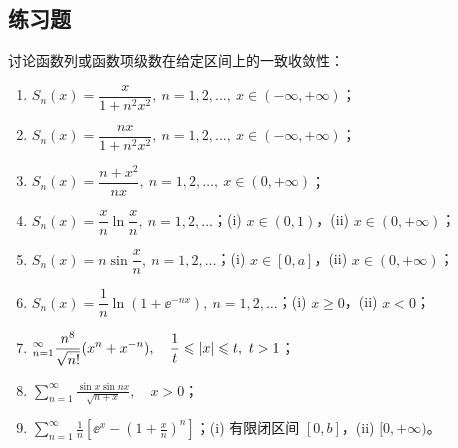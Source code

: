 \subsection{练习题}

\begin{xexercise}[1]
讨论函数列或函数项级数在给定区间上的一致收敛性：
  \begin{enumerate}[label=(\arabic*)]
    \item $S_n(x)=\dfrac{x}{1+n^2x^2},\ n=1,2,\ldots,\ x\in(-\infty,+\infty)$；
    \item $S_n(x)=\dfrac{nx}{1+n^2x^2},\ n=1,2,\ldots,\ x\in(-\infty,+\infty)$；
    \item $S_n(x)=\dfrac{n+x^2}{nx},\ n=1,2,\ldots,\ x\in(0,+\infty)$；
    \item $S_n(x)=\dfrac{x}{n}\ln\dfrac{x}{n},\ n=1,2,\ldots$；(i) $x\in(0,1)$，(ii) $x\in(0,+\infty)$；
    \item $S_n(x)=n\sin\dfrac{x}{n},\ n=1,2,\ldots$；(i) $x\in[0,a]$，(ii) $x\in(0,+\infty)$；
    \item $S_n(x)=\dfrac1n\ln(1+\ee^{-nx}),\ n=1,2,\ldots$；(i) $x\geqslant0$，(ii) $x<0$；
    \item $\displaystyle\relax_{n=1}^{\infty}\frac{n^8}{\sqrt{n!}}(x^n+x^{-n}),\quad \frac1t\leqslant\lvert x\rvert\leqslant t,\ t>1$；
    \item $\displaystyle\sum_{n=1}^{\infty}\frac{\sin x\sin nx}{\sqrt{n+x}},\quad x>0$；
    \item $\displaystyle\sum_{n=1}^{\infty}\frac1n\left[\ee^x-\left(1+\frac{x}{n}\right)^n\right]$；(i) 有限闭区间 $[0,b]$，(ii) $[0,+\infty)$。
  \end{enumerate}
\end{xexercise}
